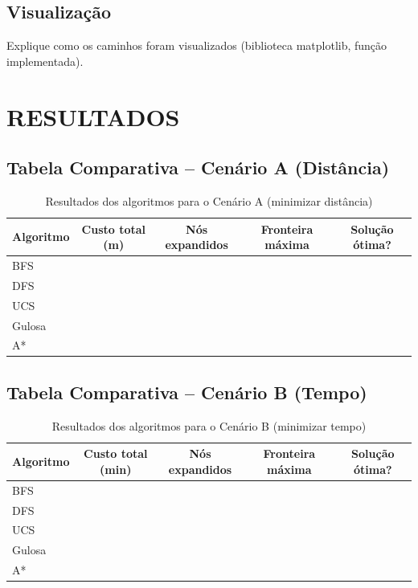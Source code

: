 \documentclass[12pt,a4paper]{article}
\begin{document}
\subsection{Visualização}
Explique como os caminhos foram visualizados (biblioteca matplotlib, função implementada).

\section{RESULTADOS}

\subsection{Tabela Comparativa – Cenário A (Distância)}

\begin{table}[H]
\centering
\begin{tabular}{|l|c|c|c|c|}
\hline
\textbf{Algoritmo} & \textbf{Custo total (m)} & \textbf{Nós expandidos} & \textbf{Fronteira máxima} & \textbf{Solução ótima?} \\
\hline
BFS &  &  &  &  \\
\hline
DFS &  &  &  &  \\
\hline
UCS &  &  &  &  \\
\hline
Gulosa &  &  &  &  \\
\hline
A* &  &  &  &  \\
\hline
\end{tabular}
\caption{Resultados dos algoritmos para o Cenário A (minimizar distância)}
\end{table}

\subsection{Tabela Comparativa – Cenário B (Tempo)}

\begin{table}[H]
\centering
\begin{tabular}{|l|c|c|c|c|}
\hline
\textbf{Algoritmo} & \textbf{Custo total (min)} & \textbf{Nós expandidos} & \textbf{Fronteira máxima} & \textbf{Solução ótima?} \\
\hline
BFS &  &  &  &  \\
\hline
DFS &  &  &  &  \\
\hline
UCS &  &  &  &  \\
\hline
Gulosa &  &  &  &  \\
\hline
A* &  &  &  &  \\
\hline
\end{tabular}
\caption{Resultados dos algoritmos para o Cenário B (minimizar tempo)}
\end{table}
\end{document}
